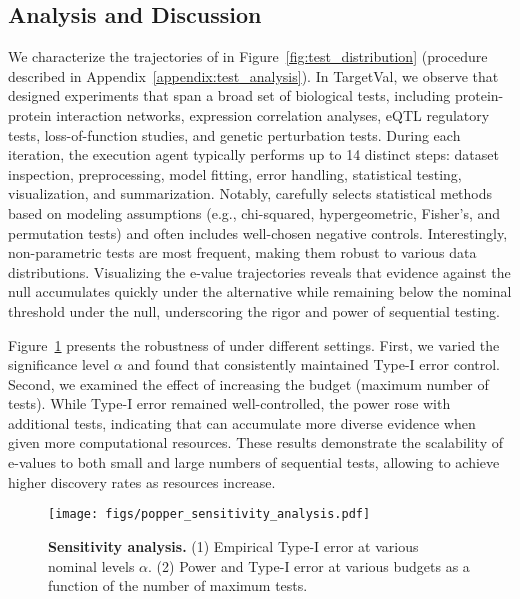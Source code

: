 \subsection{Analysis and Discussion}\label{sec:analysis}
\vspace{-0.5em}

We characterize the trajectories of \mname in Figure~\ref{fig:test_distribution} (procedure described in Appendix~\ref{appendix:test_analysis}). In TargetVal, we observe that \mname designed experiments that span a broad set of biological tests, including protein-protein interaction networks, expression correlation analyses, eQTL regulatory tests, loss-of-function studies, and genetic perturbation tests. 
During each iteration, the execution agent typically performs up to 14 distinct steps: dataset inspection, preprocessing, model fitting, error handling, statistical testing, visualization, and summarization. 
Notably, \mname carefully selects statistical methods based on modeling assumptions (e.g., chi-squared, hypergeometric, Fisher's, and permutation tests) and often includes well-chosen negative controls. 
Interestingly, non-parametric tests are most frequent, making them robust to various data distributions. 
Visualizing the e-value trajectories reveals that evidence against the null accumulates quickly under the alternative while remaining below the nominal threshold under the null, underscoring the rigor and power of sequential testing.


\vspace{-0.5em}

Figure~\ref{fig:sensitivity} presents the robustness of \mname under different settings. 
First, we varied the significance level \(\alpha\) and found that \mname consistently maintained Type-I error control. 
Second, we examined the effect of increasing the budget (maximum number of tests). 
While Type-I error remained well-controlled, the power rose with additional tests, indicating that \mname can accumulate more diverse evidence when given more computational resources. 
These results demonstrate the scalability of e-values to both small and large numbers of sequential tests, allowing \mname to achieve higher discovery rates as resources increase.

\begin{figure}[!t]
    \centering
\captionsetup{font=small}
    \texttt{[image: figs/popper\_sensitivity\_analysis.pdf]}
    \vspace{-10mm}
    \caption{\textbf{Sensitivity analysis.} (1) Empirical Type-I error at various nominal levels $\alpha$. (2) Power and Type-I error at various budgets as a function of the number of maximum tests.}
    \vspace{-5mm}
    \label{fig:sensitivity}
\end{figure}

